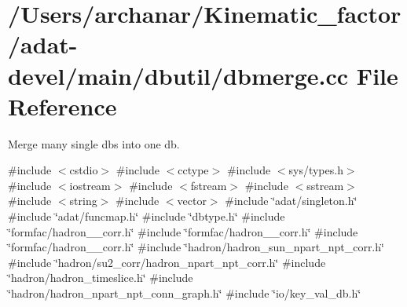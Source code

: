 \hypertarget{adat-devel_2main_2dbutil_2dbmerge_8cc}{}\section{/\+Users/archanar/\+Kinematic\+\_\+factor/adat-\/devel/main/dbutil/dbmerge.cc File Reference}
\label{adat-devel_2main_2dbutil_2dbmerge_8cc}


Merge many single dbs into one db.  


{\ttfamily \#include $<$cstdio$>$}\newline
{\ttfamily \#include $<$cctype$>$}\newline
{\ttfamily \#include $<$sys/types.\+h$>$}\newline
{\ttfamily \#include $<$iostream$>$}\newline
{\ttfamily \#include $<$fstream$>$}\newline
{\ttfamily \#include $<$sstream$>$}\newline
{\ttfamily \#include $<$string$>$}\newline
{\ttfamily \#include $<$vector$>$}\newline
{\ttfamily \#include \char`\"{}adat/singleton.\+h\char`\"{}}\newline
{\ttfamily \#include \char`\"{}adat/funcmap.\+h\char`\"{}}\newline
{\ttfamily \#include \char`\"{}dbtype.\+h\char`\"{}}\newline
{\ttfamily \#include \char`\"{}formfac/hadron\+\_\+1pt\+\_\+corr.\+h\char`\"{}}\newline
{\ttfamily \#include \char`\"{}formfac/hadron\+\_\+2pt\+\_\+corr.\+h\char`\"{}}\newline
{\ttfamily \#include \char`\"{}formfac/hadron\+\_\+3pt\+\_\+corr.\+h\char`\"{}}\newline
{\ttfamily \#include \char`\"{}hadron/hadron\+\_\+sun\+\_\+npart\+\_\+npt\+\_\+corr.\+h\char`\"{}}\newline
{\ttfamily \#include \char`\"{}hadron/su2\+\_\+corr/hadron\+\_\+npart\+\_\+npt\+\_\+corr.\+h\char`\"{}}\newline
{\ttfamily \#include \char`\"{}hadron/hadron\+\_\+timeslice.\+h\char`\"{}}\newline
{\ttfamily \#include \char`\"{}hadron/hadron\+\_\+npart\+\_\+npt\+\_\+conn\+\_\+graph.\+h\char`\"{}}\newline
{\ttfamily \#include \char`\"{}io/key\+\_\+val\+\_\+db.\+h\char`\"{}}\newline
